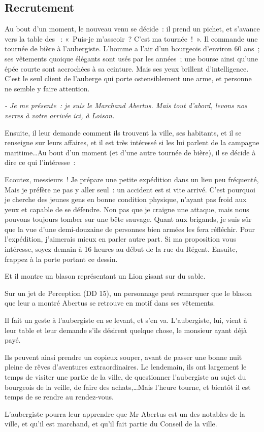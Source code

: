 \documentclass[a4paper,10pt,openany]{book}
\begin{document}
\begin{multicols}{2}
\subsection{Recrutement}
Au bout d’un moment, le nouveau venu se décide : il prend un pichet, et s’avance vers la table des \PJs : « Puis-je m’asseoir ? C’est ma
tournée ! ». Il commande une tournée de bière à l’aubergiste. L’homme a l’air d’un bourgeois d’environ 60 ans ; ses vêtements quoique élégants sont
usés par les années ; une bourse ainsi qu’une épée courte sont accrochées à sa ceinture. Mais ses yeux brillent d’intelligence. C’est le seul client
de l’auberge qui porte ostensiblement une arme, et personne ne semble y faire attention.\par\emph{- Je me présente : je suis le Marchand Abertus. Mais
tout d’abord, levons nos verres à votre arrivée ici, à Loison.}\par Ensuite, il leur demande comment ils trouvent la ville, ses habitants, et il se
renseigne sur leurs affaires, et il est très intéressé si les \PJs lui parlent de la campagne maritime\ldots Au bout d’un moment (et d’une
autre tournée de bière), il se décide à dire ce qui l’intéresse :

\begin{paperbox}{ }
	Ecoutez, messieurs ! Je prépare une petite expédition dans un lieu peu fréquenté, Mais je préfère ne pas y aller seul : un accident est si vite
	arrivé. C’est pourquoi je cherche des jeunes gens en bonne condition physique, n’ayant pas froid aux yeux et capable de se défendre. Non pas que je
	craigne une attaque, mais nous pouvons toujours tomber sur une bête sauvage. Quant aux brigands, je suis sûr que la vue d’une demi-douzaine de
	personnes bien armées les fera réfléchir. Pour l’expédition, j’aimerais mieux en parler autre part. Si ma proposition vous intéresse, soyez demain à
	16 heures au début de la rue du Régent. Ensuite, frappez à la porte portant ce dessin.
\end{paperbox}

Et il montre un blason représentant un Lion gisant sur du sable.\par Sur un jet de Perception (DD 15), un personnage peut remarquer que le blason que
leur a montré Abertus se retrouve en motif dans ses vêtements.\par Il fait un geste à l’aubergiste en se levant, et s’en va. L’aubergiste, lui, vient
à leur table et leur demande s’ils désirent quelque chose, le monsieur ayant déjà payé.\par Ils peuvent ainsi prendre un copieux souper, avant de
passer une bonne nuit pleine de rêves d’aventures extraordinaires. Le lendemain, ils ont largement le temps de visiter une partie de la ville, de
questionner l’aubergiste au sujet du bourgeois de la veille, de faire des achats,\ldots Mais l’heure tourne, et bientôt il est temps de se rendre au
rendez-vous.\par L’aubergiste pourra leur apprendre que Mr Abertus est un des notables de la ville, et qu’il est marchand, et qu’il fait partie du
Conseil de la ville.


\end{multicols}
\end{document}
